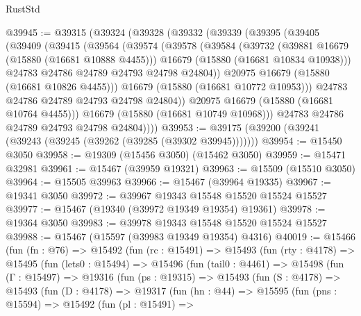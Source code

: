\begin{lexlean}{RustStd}
\begin{coremodule}
@39945 := @39315
    (@39324
      (@39328
        (@39332
          (@39339
            (@39395
              (@39405
                (@39409
                  (@39415
                    (@39564
                      (@39574
                        (@39578
                          (@39584
                            (@39732
                              (@39881 @16679 (@15880 (@16681 @10888 @4455)))
                              @16679
                              (@15880 (@16681 @10834 @10938)))
                            @24783
                            @24786
                            @24789
                            @24793
                            @24798
                            @24804))
                        @20975
                        @16679
                        (@15880 (@16681 @10826 @4455)))
                      @16679
                      (@15880 (@16681 @10772 @10953)))
                    @24783
                    @24786
                    @24789
                    @24793
                    @24798
                    @24804))
                @20975
                @16679
                (@15880 (@16681 @10764 @4455)))
              @16679
              (@15880 (@16681 @10749 @10968)))
            @24783
            @24786
            @24789
            @24793
            @24798
            @24804))))
@39953 := @39175 (@39200 (@39241 (@39243 (@39245 (@39262 (@39285 (@39302 @39945)))))))
@39954 := @15450 @3050
@39958 := @19309 (@15456 @3050) (@15462 @3050)
@39959 := @15471 @32981
@39961 := @15467 (@39959 @19321)
@39963 := @15509 (@15510 @3050)
@39964 := @15505 @39963
@39966 := @15467 (@39964 @19335)
@39967 := @19341 @3050
@39972 := @39967 @19343 @15548 @15520 @15524 @15527
@39977 := @15467 (@19340 (@39972 @19349 @19354) @19361)
@39978 := @19364 @3050
@39983 := @39978 @19343 @15548 @15520 @15524 @15527
@39988 := @15467 (@15597 (@39983 @19349 @19354) @4316)
@40019 := @15466
    (fun (fn : @76) =>
    @15492
      (fun (rc : @15491) =>
      @15493
        (fun (rty : @4178) =>
        @15495
          (fun (lets0 : @15494) =>
          @15496
            (fun (tail0 : @4461) =>
            @15498
              (fun (Γ : @15497) =>
              @19316
                (fun (ps : @19315) =>
                @15493
                  (fun (S : @4178) =>
                  @15493
                    (fun (D : @4178) =>
                    @19317
                      (fun (hn : @44) =>
                      @15595
                        (fun (pns : @15594) =>
                        @15492
                          (fun (pl : @15491) =>

\end{coremodule}
\end{lexlean}
